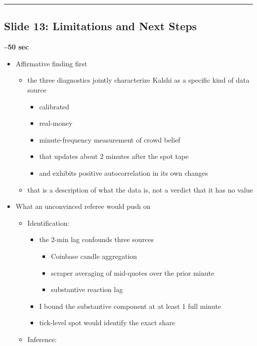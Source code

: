 \documentclass[
]{article}
\providecommand{\tightlist}{%
  \setlength{\itemsep}{0pt}\setlength{\parskip}{0pt}}
\begin{document}
\begin{center}\rule{0.5\linewidth}{0.5pt}\end{center}

\subsection{Slide 13: Limitations and Next
Steps}\label{slide-13-limitations-and-next-steps}

\textbf{\textasciitilde50 sec}

\begin{itemize}
\tightlist
\item
  Affirmative finding first

  \begin{itemize}
  \tightlist
  \item
    the three diagnostics jointly characterize Kalshi as a specific kind
    of data source

    \begin{itemize}
    \tightlist
    \item
      calibrated
    \item
      real-money
    \item
      minute-frequency measurement of crowd belief
    \item
      that updates about 2 minutes after the spot tape
    \item
      and exhibits positive autocorrelation in its own changes
    \end{itemize}
  \item
    that is a description of what the data is, not a verdict that it has
    no value
  \end{itemize}
\item
  What an unconvinced referee would push on

  \begin{itemize}
  \tightlist
  \item
    Identification:

    \begin{itemize}
    \tightlist
    \item
      the 2-min lag confounds three sources

      \begin{itemize}
      \tightlist
      \item
        Coinbase candle aggregation
      \item
        scraper averaging of mid-quotes over the prior minute
      \item
        substantive reaction lag
      \end{itemize}
    \item
      I bound the substantive component at at least 1 full minute
    \item
      tick-level spot would identify the exact share
    \end{itemize}
  \item
    Inference:


\end{itemize}
\end{itemize}
\end{document}
